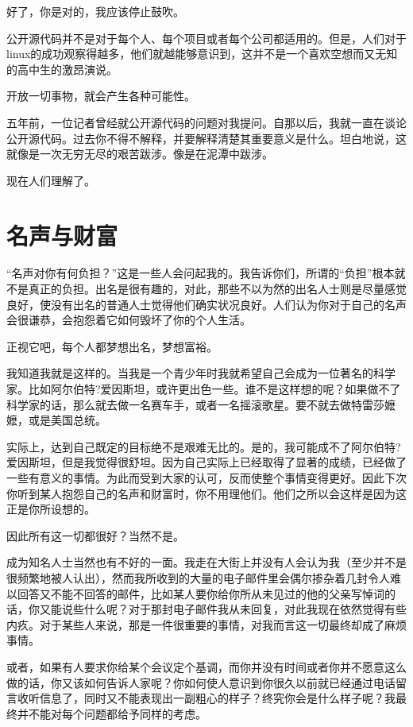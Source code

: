 好了，你是对的，我应该停止鼓吹。

公开源代码并不是对于每个人、每个项目或者每个公司都适用的。但是，人们对于linux的成功观察得越多，他们就越能够意识到，这并不是一个喜欢空想而又无知的高中生的激昂演说。

开放一切事物，就会产生各种可能性。

五年前，一位记者曾经就公开源代码的问题对我提问。自那以后，我就一直在谈论公开源代码。过去你不得不解释，并要解释清楚其重要意义是什么。坦白地说，这就像是一次无穷无尽的艰苦跋涉。像是在泥潭中跋涉。

现在人们理解了。

 
\section{名声与财富}

“名声对你有何负担？”这是一些人会问起我的。我告诉你们，所谓的“负担”根本就不是真正的负担。出名是很有趣的，对此，那些不以为然的出名人士则是尽量感觉良好，使没有出名的普通人士觉得他们确实状况良好。人们认为你对于自己的名声会很谦恭，会抱怨着它如何毁坏了你的个人生活。

正视它吧，每个人都梦想出名，梦想富裕。

我知道我就是这样的。当我是一个青少年时我就希望自己会成为一位著名的科学家。比如阿尔伯特?爱因斯坦，或许更出色一些。谁不是这样想的呢？如果做不了科学家的话，那么就去做一名赛车手，或者一名摇滚歌星。要不就去做特雷莎嬷嬷，或是美国总统。

实际上，达到自己既定的目标绝不是艰难无比的。是的，我可能成不了阿尔伯特?爱因斯坦，但是我觉得很舒坦。因为自己实际上已经取得了显著的成绩，已经做了一些有意义的事情。为此而受到大家的认可，反而使整个事情变得更好。因此下次你听到某人抱怨自己的名声和财富时，你不用理他们。他们之所以会这样是因为这正是你所设想的。

因此所有这一切都很好？当然不是。

成为知名人士当然也有不好的一面。我走在大街上并没有人会认为我（至少并不是很频繁地被人认出），然而我所收到的大量的电子邮件里会偶尔掺杂着几封令人难以回答又不能不回答的邮件，比如某人要你给你所从未见过的他的父亲写悼词的话，你又能说些什么呢？对于那封电子邮件我从未回复，对此我现在依然觉得有些内疚。对于某些人来说，那是一件很重要的事情，对我而言这一切最终却成了麻烦事情。

或者，如果有人要求你给某个会议定个基调，而你并没有时间或者你并不愿意这么做的话，你又该如何告诉人家呢？你如何使人意识到你很久以前就已经通过电话留言收听信息了，同时又不能表现出一副粗心的样子？终究你会是什么样子呢？我最终并不能对每个问题都给予同样的考虑。

